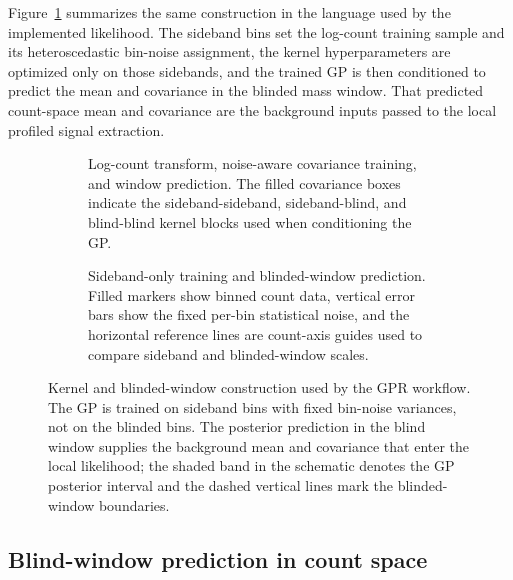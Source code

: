 Figure~\ref{fig:gpr-window-construction} summarizes the same construction in the
language used by the implemented likelihood. The sideband bins set the log-count
training sample and its heteroscedastic bin-noise assignment, the kernel hyperparameters
are optimized only on those sidebands, and the trained GP is then conditioned to predict
the mean and covariance in the blinded mass window. That predicted count-space mean and
covariance are the background inputs passed to the local profiled signal extraction.

\begin{figure}[H]
\centering
\begin{subfigure}[t]{0.52\linewidth}
  \centering
  \caption{Log-count transform, noise-aware covariance training, and window prediction.
  The filled covariance boxes indicate the sideband-sideband, sideband-blind, and
  blind-blind kernel blocks used when conditioning the GP.}
\end{subfigure}
\hfill
\begin{subfigure}[t]{0.45\linewidth}
  \centering
  \caption{Sideband-only training and blinded-window prediction. Filled markers show
  binned count data, vertical error bars show the fixed per-bin statistical noise, and
  the horizontal reference lines are count-axis guides used to compare sideband and
  blinded-window scales.}
\end{subfigure}
\caption{Kernel and blinded-window construction used by the GPR workflow. The GP is
trained on sideband bins with fixed bin-noise variances, not on the blinded bins. The
posterior prediction in the blind window supplies the background mean and covariance
that enter the local likelihood; the shaded band in the schematic denotes the GP
posterior interval and the dashed vertical lines mark the blinded-window boundaries.}
\label{fig:gpr-window-construction}
\end{figure}

\subsection{Blind-window prediction in count space}
\label{sec:blind-window-prediction}


